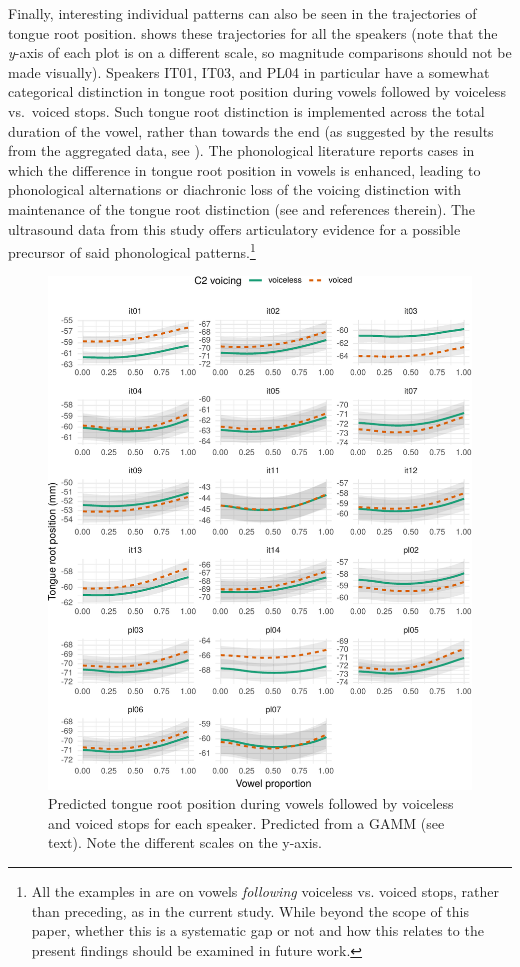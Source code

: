 \documentclass[preprint]{JASAnew}
\begin{document}
Finally, interesting individual patterns can also be seen in the
trajectories of tongue root position.  shows these
trajectories for all the speakers (note that the \emph{y}-axis of each
plot is on a different scale, so magnitude comparisons should not be
made visually). Speakers IT01, IT03, and PL04 in particular have a
somewhat categorical distinction in tongue root position during vowels
followed by voiceless vs.~voiced stops. Such tongue root distinction is
implemented across the total duration of the vowel, rather than towards
the end (as suggested by the results from the aggregated data, see
). The phonological literature reports cases in which the
difference in tongue root position in vowels is enhanced, leading to
phonological alternations or diachronic loss of the voicing distinction
with maintenance of the tongue root distinction (see \citealt{vaux1996}
and references therein). The ultrasound data from this study offers
articulatory evidence for a possible precursor of said phonological
patterns.\footnote{All the examples in \citet{vaux1996} are on vowels \textit{following} voiceless vs. voiced stops, rather than preceding, as in the current study. While beyond the scope of this paper, whether this is a systematic gap or not and how this relates to the present findings should be examined in future work.}

\begin{figure}
\includegraphics[width=\linewidth]{./Figure10} \caption{Predicted tongue root position during vowels followed by voiceless and voiced stops for each speaker. Predicted from a GAMM (see text). Note the different scales on the y-axis.}\label{f:Figure10}
\end{figure}
\end{document}
